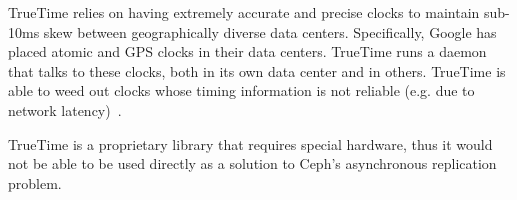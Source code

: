 TrueTime relies on having extremely accurate and precise clocks to
maintain sub-10ms skew between geographically diverse data
centers. Specifically, Google has placed atomic and GPS clocks in
their data centers. TrueTime runs a daemon that talks to these clocks,
both in its own data center and in others. TrueTime is able to weed
out clocks whose timing information is not reliable (e.g. due to
network latency)~\citep{Corbett2012}.

TrueTime is a proprietary library that requires special hardware, thus
it would not be able to be used directly as a solution to Ceph's
asynchronous replication problem.

